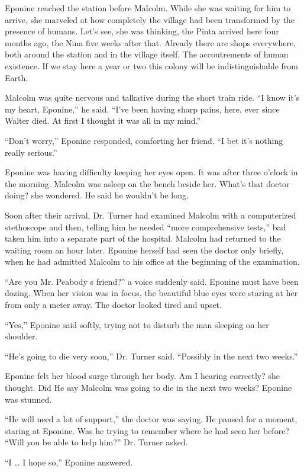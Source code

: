 \documentclass[]{article}
\begin{document}
{Eponine reached the station before Malcolm. While she was waiting for him to arrive, she marveled at how completely the village had been transformed by the presence of humans. Let’s see, she was thinking, the Pinta arrived here four months ago, the Nina five weeks after that. Already there are shops everywhere, both around the station and in the village itself. The accoutrements of human existence. If we stay here a year or two this colony will be indistinguishable from Earth.

Malcolm was quite nervous and talkative during the short train ride. “I know it’s my heart, Eponine,” he said. “I’ve been having sharp pains, here, ever since Walter died. At first I thought it was all in my mind.”

“Don’t worry,” Eponine responded, comforting her friend. “I bet it’s nothing really serious.”

Eponine was having difficulty keeping her eyes open. ft was after three o’clock in the morning. Malcolm was asleep on the bench beside her. What’s that doctor doing? she wondered. He said he wouldn’t be long.

Soon after their arrival, Dr. Turner had examined Malcolm with a computerized stethoscope and then, telling him he needed “more comprehensive tests,” bad taken him into a separate part of the hospital. Malcolm had returned to the waiting room an hour later. Eponine herself had seen the doctor only briefly, when he had admitted Malcolm to his office at the beginning of the examination.

“Are you Mr. Peabody s friend?” a voice suddenly said. Eponine must have been dozing. When her vision was in focus, the beautiful blue eyes were staring at her from only a meter away. The doctor looked tired and upset.

“Yes,” Eponine said softly, trying not to disturb the man sleeping on her shoulder.

“He’s going to die very soon,” Dr. Turner said. “Possibly in the next two weeks.”

Eponine felt her blood surge through her body. Am I hearing correctly? she thought. Did He say Malcolm was going to die in the next two weeks? Eponine was stunned.

“He will need a lot of support,” the doctor was saying. He paused for a moment, staring at Eponine. Was he trying to remember where he had seen her before? “Will you be able to help him?” Dr. Turner asked.

“I … I hope so,” Eponine answered.

}
\end{document}

